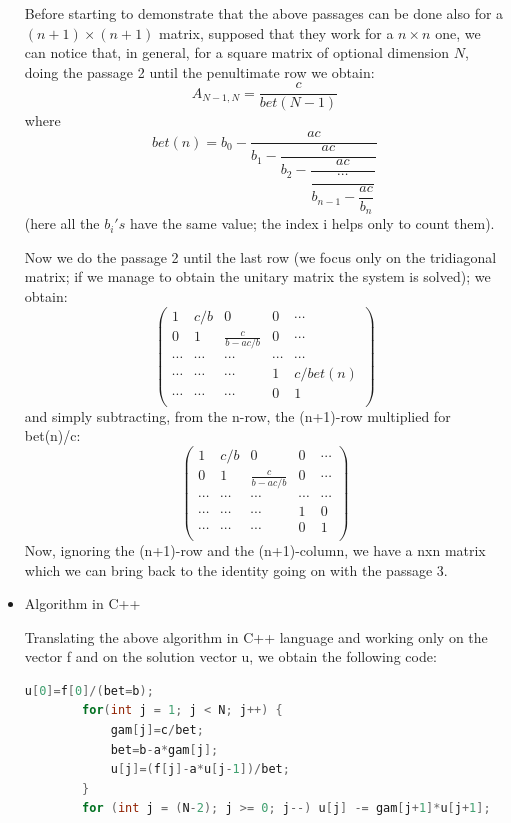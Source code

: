 \documentclass {article}
\begin{document}
\begin{itemize}
	Before starting to demonstrate that the above passages can be done also for a $(n+1) \times (n+1)$ matrix, supposed that they work for a $n \times n$ one, we can notice that, in general, for a square matrix of optional dimension $N$, doing the passage 2 until the penultimate row we obtain:
	$$A_{N-1,N}=\frac{c}{bet(N-1)}$$
	where 
	$$bet(n)=b_0-\dfrac{ac}{b_1-\dfrac{ac}{b_2-\dfrac{ac}{\dfrac{\cdots}{b_{n-1}-\dfrac{ac}{b_n}}}}}$$
	(here all the $b_i's$ have the same value; the index i helps only to count them).
	
	Now we do the passage 2 until the last row (we focus only on the tridiagonal matrix; if we manage to obtain the unitary matrix the system is solved); we obtain:
	\begin{equation}
	\left(
	\begin{array}{ccccc}
	  1 & c/b & 0 & 0 & \cdots \\
	  0 & 1 & \frac{c}{b-ac/b} & 0 & \cdots \\
	  \cdots & \cdots & \cdots & \cdots & \cdots \\
	  \cdots & \cdots & \cdots & 1 & c/bet(n) \\
	  \cdots & \cdots & \cdots & 0 & 1 \\
	\end{array}
	\right)
	\end{equation}
	and simply subtracting, from the n-row, the (n+1)-row multiplied for bet(n)/c:
	\begin{equation}
	\left(
	\begin{array}{ccccc}
	  1 & c/b & 0 & 0 & \cdots \\
	  0 & 1 & \frac{c}{b-ac/b} & 0 & \cdots \\
	  \cdots & \cdots & \cdots & \cdots & \cdots \\
	  \cdots & \cdots & \cdots & 1 & 0 \\
	  \cdots & \cdots & \cdots & 0 & 1 \\
	\end{array}
	\right)
	\end{equation}
	Now, ignoring the (n+1)-row and the (n+1)-column, we have a nxn matrix which we can bring back to the identity going on with the passage 3.

\item Algorithm in C++

	Translating the above algorithm in C++ language and working only on the vector f and on the solution vector u, we obtain the following code:
	\begin{lstlisting}[language=cpp]
		u[0]=f[0]/(bet=b);
	    for(int j = 1; j < N; j++) {
	        gam[j]=c/bet;
	        bet=b-a*gam[j];
	        u[j]=(f[j]-a*u[j-1])/bet;
	    }
	    for (int j = (N-2); j >= 0; j--) u[j] -= gam[j+1]*u[j+1];
	\end{lstlisting}

\end{itemize}
\end{document}
